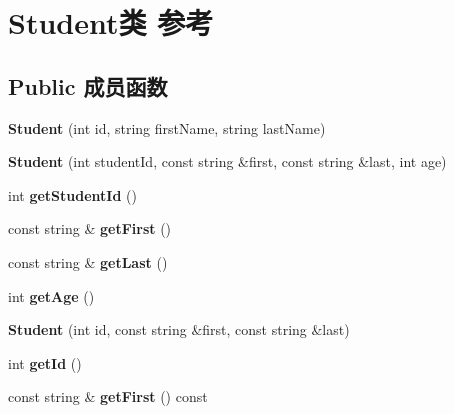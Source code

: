 \hypertarget{struct_student}{}\section{Student类 参考}
\label{struct_student}
\subsection*{Public 成员函数}
\begin{DoxyCompactItemize}
\item 
\mbox{\label{struct_student_a06e0a697f88cc5a60793f7ec15e7e49e}} 
{\bfseries Student} (int id, string first\+Name, string last\+Name)
\item 
\mbox{\label{struct_student_aa5893f5d28a946f8c02c98b742f9ea43}} 
{\bfseries Student} (int student\+Id, const string \&first, const string \&last, int age)
\item 
\mbox{\label{struct_student_a4956a83c5c065f122bd49dc33e0ca031}} 
int {\bfseries get\+Student\+Id} ()
\item 
\mbox{\label{struct_student_ac8493c881d2b56ffab15826f76c04bcd}} 
const string \& {\bfseries get\+First} ()
\item 
\mbox{\label{struct_student_a3ec79dce2a7bc51c36fce382189f8f79}} 
const string \& {\bfseries get\+Last} ()
\item 
\mbox{\label{struct_student_af5f9f3b900400078d9dd4cf993701be9}} 
int {\bfseries get\+Age} ()
\item 
\mbox{\label{struct_student_a695746a6d5d07bdd7490dc5e2e643065}} 
{\bfseries Student} (int id, const string \&first, const string \&last)
\item 
\mbox{\label{struct_student_a78a58b686f5fe10a925cf5c9881d4b4e}} 
int {\bfseries get\+Id} ()
\item 
\mbox{\label{struct_student_a65d707a5139471b0bd79bd875940daf0}} 
const string \& {\bfseries get\+First} () const
\item 
\mbox{\label{struct_student_a94ea3dc95b6f86325495e44a88cdab5b}} 

\end{DoxyCompactItemize}
